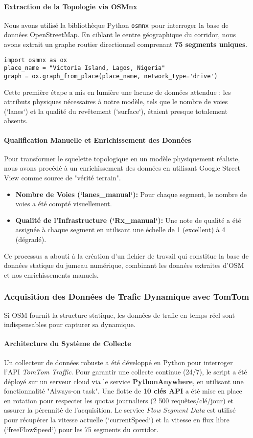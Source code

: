 \paragraph{Extraction de la Topologie via OSMnx}
Nous avons utilisé la bibliothèque Python \texttt{osmnx} pour interroger la base de données OpenStreetMap. En ciblant le centre géographique du corridor, nous avons extrait un graphe routier directionnel comprenant \textbf{75 segments uniques}.
\begin{verbatim}
import osmnx as ox
place_name = "Victoria Island, Lagos, Nigeria"
graph = ox.graph_from_place(place_name, network_type='drive')
\end{verbatim}
Cette première étape a mis en lumière une lacune de données attendue : les attributs physiques nécessaires à notre modèle, tels que le nombre de voies (`lanes`) et la qualité du revêtement (`surface`), étaient presque totalement absents.

\paragraph{Qualification Manuelle et Enrichissement des Données}
Pour transformer le squelette topologique en un modèle physiquement réaliste, nous avons procédé à un enrichissement des données en utilisant Google Street View comme source de "vérité terrain".
\begin{itemize}
       \item \textbf{Nombre de Voies (`lanes\_manual`):} Pour chaque segment, le nombre de voies a été compté visuellement.
       \item \textbf{Qualité de l'Infrastructure (`Rx\_manual`):} Une note de qualité a été assignée à chaque segment en utilisant une échelle de 1 (excellent) à 4 (dégradé).
\end{itemize}
Ce processus a abouti à la création d'un fichier de travail qui constitue la base de données statique du jumeau numérique, combinant les données extraites d'OSM et nos enrichissements manuels.

\subsubsection{Acquisition des Données de Trafic Dynamique avec TomTom}
Si OSM fournit la structure statique, les données de trafic en temps réel sont indispensables pour capturer sa dynamique.

\paragraph{Architecture du Système de Collecte}
Un collecteur de données robuste a été développé en Python pour interroger l'API \textit{TomTom Traffic}. Pour garantir une collecte continue (24/7), le script a été déployé sur un serveur cloud via le service \textbf{PythonAnywhere}, en utilisant une fonctionnalité "Always-on task". Une flotte de \textbf{10 clés API} a été mise en place en rotation pour respecter les quotas journaliers (2 500 requêtes/clé/jour) et assurer la pérennité de l'acquisition. Le service \textit{Flow Segment Data} est utilisé pour récupérer la vitesse actuelle (`currentSpeed`) et la vitesse en flux libre (`freeFlowSpeed`) pour les 75 segments du corridor.

